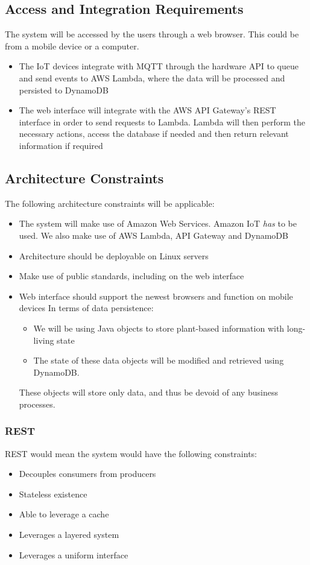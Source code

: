 \documentclass{article}
\begin{document}
\subsection{Access and Integration Requirements}
The system will be accessed by the users through a web browser. This could be from a mobile device or a computer. 
\begin{itemize}
	\item The IoT devices integrate with MQTT through the hardware API to queue and send events to AWS Lambda, where the data will be processed and persisted to DynamoDB
	\item The web interface will integrate with the AWS API Gateway's REST interface in order to send requests to Lambda. Lambda will then perform the necessary actions, access the database if needed and then return relevant information if required
\end{itemize}

\subsection{Architecture Constraints}
The following architecture constraints will be applicable:
\begin{itemize}
	\item The system will make use of Amazon Web Services. Amazon IoT \textit{has} to be used. We also make use of AWS Lambda, API Gateway and DynamoDB
	\item Architecture should be deployable on Linux servers
	\item Make use of public standards, including on the web interface
	\item Web interface should support the newest browsers and function on mobile devices
	In terms of data persistence:
	\begin{itemize}
		\item We will be using Java objects to store plant-based information with long-living state
		\item The state of these data objects will be modified and retrieved using DynamoDB.
	\end{itemize}
	These objects will store only data, and thus be devoid of any business processes.
\end{itemize}
\subsubsection{REST}
	REST would mean the system would have the following constraints:
	\begin{itemize}
		\item Decouples consumers from producers
		\item Stateless existence
		\item Able to leverage a cache
		\item Leverages a layered system
		\item Leverages a uniform interface
	\end{itemize}
\end{document}
